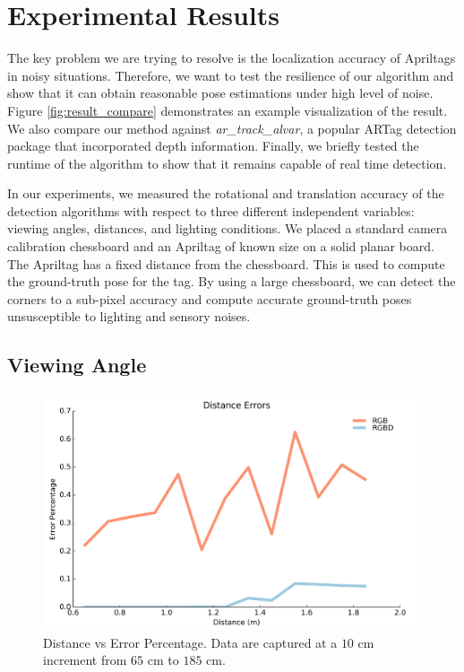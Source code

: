 \section{Experimental Results}

The key problem we are trying to resolve is the localization accuracy of Apriltags in noisy situations. Therefore, we want to test the resilience of our algorithm and show that it can obtain reasonable pose estimations under high level of noise. Figure \ref{fig:result_compare} demonstrates an example visualization of the result. We also compare our method against \textit{ar\_track\_alvar}, a popular ARTag detection package that incorporated depth information. Finally, we briefly tested the runtime of the algorithm to show that it remains capable of real time detection. 

In our experiments, we measured the rotational and translation accuracy of the detection algorithms with respect to three different independent variables: viewing angles, distances, and lighting conditions. We placed a standard camera calibration chessboard and an Apriltag of known size on a solid planar board. The Apriltag has a fixed distance from the chessboard. This is used to compute the ground-truth pose for the tag. By using a large chessboard, we can detect the corners to a sub-pixel accuracy and compute accurate ground-truth poses unsusceptible to lighting and sensory noises. 

\subsection{Viewing Angle}

\begin{figure}
\centering
\includegraphics[width=\columnwidth]{figs/distance_fig2}
\caption{Distance vs Error Percentage. Data are captured at a $10$ cm increment from $65$ cm to $185$ cm.}
\label{fig:distance_result}
\end{figure}

